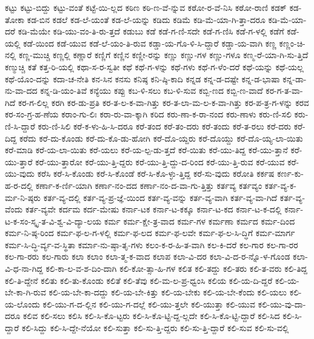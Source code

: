 {ಕಟ್ಟು
ಕಟ್ಟು-ಬಿದ್ದು
ಕಟ್ಟು-ವಂತೆ
ಕಟ್ಟೆ-ಯಿ-ಲ್ಲದ
ಕಠಿಣ
ಕಠಿ-ಣ-ವೆ-ನ್ನುವ
ಕಠೋ-ರ-ವೆ-ನಿಸಿ
ಕಠೋ-ರಾಣಿ
ಕಡಕ್
ಕಡ-ತೋಕಾ
ಕಡ-ಬಿನ
ಕಡಲೆ
ಕಡ-ಲೆ-ಯಂತೆ
ಕಡ-ಲೆ-ಯನ್ನು
ಕಡಿದು
ಕಡಿಮೆ
ಕಡಿ-ಮೆ-ಯಾ-ಗಿ-ತ್ತಾ-ದರೂ
ಕಡಿ-ಮೆ-ಯಾ-ದರೆ
ಕಡಿ-ಮೆಯೇ
ಕಡಿ-ಯು-ವಂ-ತಿ-ರು-ತ್ತದೆ
ಕಡುಬು
ಕಡೆ
ಕಡೆ-ಗ-ಣಿ-ಸದೇ
ಕಡೆ-ಗ-ಣಿಸಿ
ಕಡೆ-ಗ-ಳಲ್ಲಿ
ಕಡೆಗೆ
ಕಡೆ-ಯಲ್ಲಿ
ಕಡೆ-ಯಿಂದ
ಕಡೆ-ಯುವ
ಕಡೆ-ಲೆ-ಯಂ-ತಿ-ರುವ
ಕಡ್ಡಾ-ಯ-ಗೊ-ಳಿ-ಸಿ-ದ್ದಾರೆ
ಕಡ್ಡಾ-ಯ-ವಾಗಿ
ಕಣ್ಣ
ಕಣ್ಣಂ-ಚಿ-ನಲ್ಲಿ
ಕಣ್ಣ-ಮುಚ್ಚಿ
ಕಣ್ಣಲ್ಲಿ
ಕಣ್ಣಾರೆ
ಕಣ್ಣಿಗೆ
ಕಣ್ಣಿನ
ಕಣ್ಣೀ-ರನ್ನು
ಕಣ್ಣು
ಕಣ್ಣು-ಗಳ
ಕಣ್ಣು-ಗಳೂ
ಕಣ್ಮ-ರೆ-ಯಾ-ಗಿ-ಸು-ತ್ತಿದೆ
ಕಣ್ಮುಚ್ಚಿ
ಕತೆ
ಕತ್ತ-ರಿ-ಯಲ್ಲಿ
ಕಥಾ-ಸ-ರ-ಸ್ವತೀ
ಕಥೆ
ಕಥೆ-ಗ-ಳನ್ನು
ಕಥೆ-ಗಳು
ಕಥೆ-ಗ-ಳೆಂ-ದರೆ
ಕಥೆ-ಯನ್ನು
ಕಥೆ-ಯಲ್ಲ
ಕಥೆ-ಯೊಂ-ದನ್ನು
ಕದಾ-ಚ-ನೇತಿ
ಕನ-ಸಿನ
ಕನಸು
ಕನಿಷ್ಠ
ಕನಿ-ಷ್ಠಿ-ಕಾದಿ
ಕನ್ನಡ
ಕನ್ನ-ಡ-ದಷ್ಟೇ
ಕನ್ನ-ಡ-ಭಾಷಾ
ಕನ್ನ-ಡಾ-ನು-ವಾ-ದದ
ಕನ್ನ-ಡಿ-ಯಂ-ತಿವೆ
ಕನ್ಯೆಯು
ಕಪ್ಪು
ಕಬ-ಳಿ-ಸಲು
ಕಬ-ಳಿ-ಸುವ
ಕಬ್ಬಿ-ಣದ
ಕಬ್ಬಿ-ಣ-ವಾದೆ
ಕರ-ಗ-ತ-ವಾ-ಗಿದೆ
ಕರ-ಗ-ಲಿಲ್ಲ
ಕರಗಿ
ಕರ-ಡು-ಪ್ರತಿ
ಕರ-ತ-ಲ-ಕ-ವಾ-ಗಿತ್ತು
ಕರ-ತ-ಲಾ-ಮ-ಲ-ಕ-ವಾ-ಗಿತ್ತು
ಕರ-ಪ-ತ್ರ-ಗ-ಳನ್ನು
ಕರವ
ಕರ-ಸಂ-ಗ್ರ-ಹ-ಣೆಯ
ಕರಾಂ-ಗು-ಲಿಃ
ಕರಾ-ರು-ವಾ-ಕ್ಕಾಗಿ
ಕರಿದ
ಕರು-ಣಾ-ಕ-ರಾ-ನಂದ
ಕರು-ಣಾಳು
ಕರು-ಣಿ-ಸಲಿ
ಕರು-ಣಿ-ಸಿ-ದ್ದಾರೆ
ಕರು-ಣಿ-ಸಿಲಿ
ಕರೆ-ಕ-ಳು-ಹಿ-ಸಿ-ದರೂ
ಕರೆ-ತಂದ
ಕರೆ-ತಂ-ದರು
ಕರೆ-ತಂದು
ಕರೆ-ತ-ರಲು
ಕರೆ-ದರು
ಕರೆ-ದಿದ್ದ
ಕರೆದು
ಕರೆ-ದು-ಕೊಂಡು
ಕರೆ-ದು-ಕೊ-ಡು-ಹೋಗಿ
ಕರೆ-ದೊ-ಯ್ದರು
ಕರೆ-ದೊಯ್ದು
ಕರೆ-ದೊ-ಯ್ಯ-ಲಾ-ಯಿತು
ಕರೆ-ಮಾಡಿ
ಕರೆ-ಯ-ಲಾ-ಯಿತು
ಕರೆ-ಯಲು
ಕರೆ-ಯ-ಲ್ಪ-ಡು-ತ್ತದೆ
ಕರೆ-ಯಿತು
ಕರೆ-ಯು-ತಿದ್ದ
ಕರೆ-ಯು-ತ್ತಾನೆ
ಕರೆ-ಯು-ತ್ತಾರೆ
ಕರೆ-ಯು-ತ್ತಾರೋ
ಕರೆ-ಯು-ತ್ತಿ-ದ್ದರು
ಕರೆ-ಯು-ತ್ತಿ-ದ್ದು-ದ-ರಿಂದ
ಕರೆ-ಯು-ತ್ತಿ-ರುವ
ಕರೆ-ಯುವ
ಕರೆ-ಯು-ವುದು
ಕರೆಸಿ
ಕರೆ-ಸಿ-ಕೊಂಡು
ಕರೆ-ಸಿ-ಕೊಂಡೆ
ಕರೆ-ಸಿ-ಕೊ-ಳ್ಳು-ತ್ತಿದ್ದ
ಕರೆ-ಸು-ವುದು
ಕರೋತಿ
ಕರ್ಕಷ
ಕರ್ಣ-ಕು-ಹ-ರ-ದಲ್ಲಿ
ಕರ್ಣಾ-ಕ-ರ್ಣಿ-ಯಾಗಿ
ಕರ್ಣಾ-ನಂ-ದದ
ಕರ್ಣಾ-ನಂ-ದ-ವಾ-ಗು-ತ್ತಿತ್ತು
ಕರ್ತವ್ಯ
ಕರ್ತವ್ಯಂ
ಕರ್ತ-ವ್ಯ-ಕ-ರ್ಮ-ನಿ-ಷ್ಠರು
ಕರ್ತ-ವ್ಯ-ದಲ್ಲಿ
ಕರ್ತ-ವ್ಯ-ಪ್ರ-ಜ್ಞೆ-ಯಿಂದ
ಕರ್ತ-ವ್ಯ-ವನ್ನು
ಕರ್ತ-ವ್ಯ-ವಾಗಿ
ಕರ್ತ-ವ್ಯ-ವಾ-ಗಿದೆ
ಕರ್ತ-ವ್ಯ-ವೆಂದು
ಕರ್ತ-ವ್ಯವೇ
ಕರ್ದಮ
ಕರ್ದ-ಮೇಷು
ಕರ್ನಾ-ಟಕ
ಕರ್ನಾ-ಟ-ಕಕ್ಕೂ
ಕರ್ನಾ-ಟ-ಕದ
ಕರ್ನಾ-ಟ-ಕ-ದಲ್ಲಿ
ಕರ್ನಾ-ಟ-ಕ-ಸಂ-ಸ್ಕೃ-ತ-ವಿ-ಶ್ವ-ವಿ-ದ್ಯಾ-ಲಯ
ಕರ್ಮ
ಕರ್ಮ-ಕ್ಷೇ-ತ್ರ-ವಾದ
ಕರ್ಮ-ಗಳ
ಕರ್ಮಣಾ
ಕರ್ಮದ
ಕರ್ಮ-ದಿಂದ
ಕರ್ಮ-ನಿ-ಷ್ಠ-ರಿಂದ
ಕರ್ಮ-ಫ-ಲ-ಗ-ಳಲ್ಲಿ
ಕರ್ಮ-ಫ-ಲದ
ಕರ್ಮ-ಫ-ಲವೇ
ಕರ್ಮ-ಫ-ಲ-ಸಿ-ದ್ಧಿಗೆ
ಕರ್ಮ-ಮಾರ್ಗ
ಕರ್ಮ-ಸಿ-ದ್ಧಿ-ರ್ವ್ಯ-ವ-ಸ್ಥಿತಾ
ಕರ್ಮಾ-ನು-ಷ್ಠಾ-ತೃ-ಗಳು
ಕಲಂ-ಕ-ರ-ಹಿ-ತ-ವಾಗಿ
ಕಲ-ಕಿ-ದರೆ
ಕಲ-ಗಾರ
ಕಲ-ಗಾ-ರರ
ಕಲ-ಗಾ-ರರು
ಕಲ-ಗಾರು
ಕಲಾ
ಕಲಾಂ
ಕಲಾ-ತ್ಮ-ಕ-ವಾದ
ಕಲಾಪ
ಕಲಾ-ವಿ-ದರ
ಕಲಾ-ವಿ-ದ-ರ-ನ್ನೊ-ಳ-ಗೊಂಡ
ಕಲಾ-ವಿ-ಧ-ನಾ-ಗಿದ್ದ
ಕಲಿ-ಕಾ-ಲ-ವ-ಶ-ದಿಂ-ದಾಗಿ
ಕಲಿ-ಕೋ-ತ್ಸಾ-ಹಿ-ಗಳ
ಕಲಿತ
ಕಲಿ-ತದ್ದು
ಕಲಿ-ತರು
ಕಲಿ-ತ-ವರು
ಕಲಿ-ತಿದ್ದ
ಕಲಿ-ತಿ-ದ್ದೇನೆ
ಕಲಿತು
ಕಲಿ-ತು-ಕೊಂಡು
ಕಲಿತೆ
ಕಲಿ-ತೆವು
ಕಲಿ-ಮ-ಲ-ಪ್ರ-ಧ್ವಂಸಿ
ಕಲಿಯ
ಕಲಿ-ಯ-ದಿ-ದ್ದರೆ
ಕಲಿ-ಯ-ಬೇ-ಕಾ-ಗಿ-ರುವ
ಕಲಿ-ಯ-ಬೇ-ಕಾ-ದದ್ದು
ಕಲಿ-ಯ-ಬೇ-ಕಿತ್ತು
ಕಲಿ-ಯ-ಬೇಕು
ಕಲಿ-ಯ-ಬೇ-ಕೆಂದು
ಕಲಿ-ಯಲು
ಕಲಿ-ಯ-ಲೊಂದು
ಕಲಿ-ಯು-ಗ-ದ-ಲ್ಲಿನ
ಕಲಿ-ಯು-ಗ-ದಲ್ಲೆ
ಕಲಿ-ಯು-ತ್ತಲೇ
ಕಲಿ-ಯುತ್ತಾ
ಕಲಿ-ಯುವ
ಕಲಿ-ಯು-ವು-ದಾ-ದರೂ
ಕಲಿವ
ಕಲಿ-ಸಲು
ಕಲಿಸಿ
ಕಲಿ-ಸಿ-ಕೊ-ಟ್ಟರು
ಕಲಿ-ಸಿ-ಕೊ-ಟ್ಟಿ-ದ್ದ-ಲ್ಲದೇ
ಕಲಿ-ಸಿ-ಕೊ-ಟ್ಟಿ-ದ್ದಾರೆ
ಕಲಿ-ಸಿದ
ಕಲಿ-ಸಿ-ದ್ದಾರೆ
ಕಲಿ-ಸಿದ್ದು
ಕಲಿ-ಸಿ-ದ್ದೇ-ನೆಯೋ
ಕಲಿ-ಸುತ್ತಾ
ಕಲಿ-ಸು-ತ್ತಿ-ದ್ದರು
ಕಲಿ-ಸು-ತ್ತಿ-ದ್ದಾರೆ
ಕಲಿ-ಸುವ
ಕಲಿ-ಸು-ವಲ್ಲಿ
}
